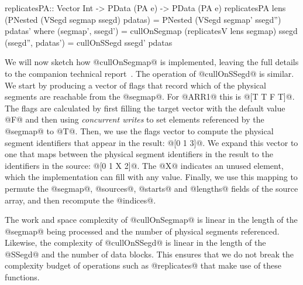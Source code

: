 \begin{small}
\begin{code}
replicatesPA:: Vector Int -> PData (PA e) -> PData (PA e)
replicatesPA lens (PNested (VSegd segmap ssegd) pdatas)
 = PNested (VSegd segmap' ssegd'') pdatas'
 where (segmap', ssegd') 
        = cullOnSegmap (replicatesV lens segmap) ssegd
       (ssegd'',  pdatas')
        = cullOnSSegd   ssegd' pdatas
\end{code}
\end{small}
\par
We will now sketch how @cullOnSegmap@ is implemented, leaving the full details to the companion technical report~\cite{lippmeier-etal:replicate-tr}.  The operation of @cullOnSSegd@ is similar. We start by producing a vector of flags that record which of the physical segments are reachable from the @segmap@. For @ARR1@ this is @[T T F T]@. The flags are calculated by first filling the target vector with the default value @F@ and then using \emph{concurrent writes} to set elements referenced by the @segmap@ to @T@. Then, we use the flags vector to compute the physical segment identifiers that appear in the result: @[0 1 3]@. We expand this vector to one that maps between the physical segment identifiers in the result to the identifiers in the source: @[0 1 X 2]@. The @X@ indicates an unused element, which the implementation can fill with any value. Finally, we use this mapping to permute the @segmap@, @sources@, @starts@ and @lengths@ fields of the source array, and then recompute the @indices@.

The work and space complexity of @cullOnSegmap@ is linear in the length of the @segmap@ being processed and the number of physical segments referenced. Likewise, the complexity of @cullOnSSegd@ is linear in the length of the @SSegd@ and the number of data blocks. This ensures that we do not break the complexity budget of operations such as @replicates@ that make use of these functions.


